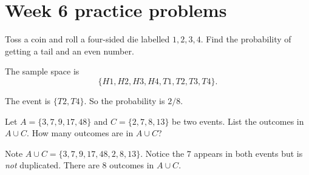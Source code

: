 \documentclass[../main.tex]{subfiles}
\begin{document}
\section{Week 6 practice problems}

\begin{example}
  Toss a coin and roll a four-sided die labelled \(1,2,3,4\).  Find the probability of getting a tail and an even number.

  \begin{solution}
    The sample space is 
    \[
      \{ H1, H2, H3, H4, T1, T2, T3, T4 \}.
    \]

    The event is \(\{ T2, T4 \}\). So the probability is \(2/8\).
  \end{solution}
\end{example}

\begin{exercise}
  Let \(A = \{3,7,9,17,48\}\) and \(C = \{2,7,8,13\}\) be two events. List the outcomes in \(A \cup C\). How many outcomes are in \(A \cup C\)?

  \begin{solution}
    Note \(A \cup C = \{ 3,7,9,17,48, 2,8,13 \}\). Notice the \(7\) appears in both events but is \emph{not} duplicated.  There are \(8\) outcomes in \(A \cup C\).
  \end{solution}
\end{exercise}
\end{document}
